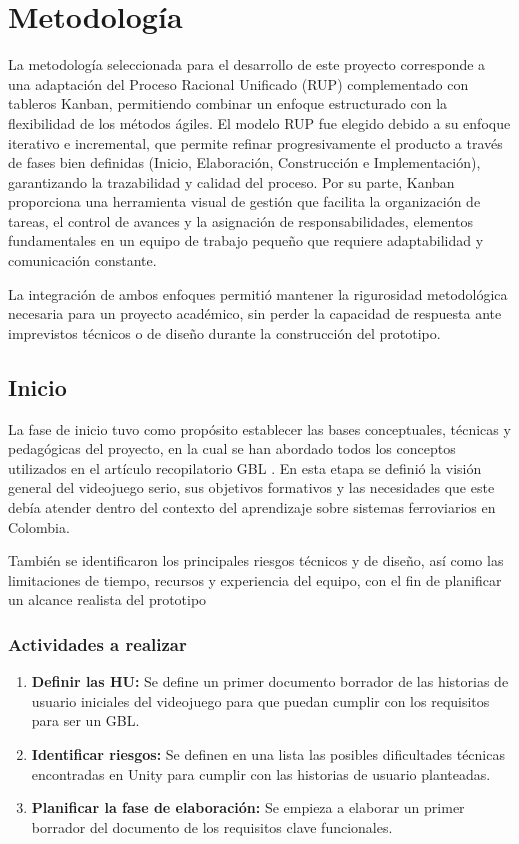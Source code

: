 

\chapter{Metodología}

La metodología seleccionada para el desarrollo de este proyecto corresponde a una adaptación del Proceso Racional Unificado (RUP) complementado con tableros Kanban, permitiendo combinar un enfoque estructurado con la flexibilidad de los métodos ágiles.
El modelo RUP fue elegido debido a su enfoque iterativo e incremental, que permite refinar progresivamente el producto a través de fases bien definidas (Inicio, Elaboración, Construcción e Implementación), garantizando la trazabilidad y calidad del proceso.
Por su parte, Kanban proporciona una herramienta visual de gestión que facilita la organización de tareas, el control de avances y la asignación de responsabilidades, elementos fundamentales en un equipo de trabajo pequeño que requiere adaptabilidad y comunicación constante.

La integración de ambos enfoques permitió mantener la rigurosidad metodológica necesaria para un proyecto académico, sin perder la capacidad de respuesta ante imprevistos técnicos o de diseño durante la construcción del prototipo.


\section{Inicio}

La fase de inicio tuvo como propósito establecer las bases conceptuales, técnicas y pedagógicas del proyecto, en la cual se han abordado todos los conceptos utilizados en el artículo recopilatorio GBL \autocite{gblFrameworkExamining}. En esta etapa se definió la visión general del videojuego serio, sus objetivos formativos y las necesidades que este debía atender dentro del contexto del aprendizaje sobre sistemas ferroviarios en Colombia.

También se identificaron los principales riesgos técnicos y de diseño, así como las limitaciones de tiempo, recursos y experiencia del equipo, con el fin de planificar un alcance realista del prototipo

\subsection{Actividades a realizar}

\begin{enumerate}
  \item \textbf{Definir las HU:} Se define un primer documento borrador de las historias de usuario iniciales del videojuego para que puedan cumplir con los requisitos para ser un GBL.
  \item \textbf{Identificar riesgos:} Se definen en una lista las posibles dificultades técnicas encontradas en Unity para cumplir con las historias de usuario planteadas.
  \item \textbf{Planificar la fase de elaboración:} Se empieza a elaborar un primer borrador del documento de los requisitos clave funcionales.
\end{enumerate}

